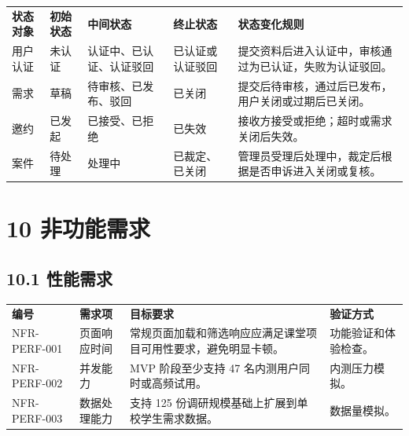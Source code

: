 {\def\LTcaptype{none} %
\begin{xltabular}{\textwidth}{@{}>{\centering\arraybackslash}X>{\centering\arraybackslash}X>{\centering\arraybackslash}X>{\centering\arraybackslash}X>{\centering\arraybackslash}X@{}}
\toprule\noalign{}
\endhead
\bottomrule\noalign{}
\endlastfoot
\textbf{状态对象} & \textbf{初始状态} & \textbf{中间状态} &
\textbf{终止状态} & \textbf{状态变化规则} \\
用户认证 & 未认证 & 认证中、已认证、认证驳回 & 已认证或认证驳回 &
提交资料后进入认证中，审核通过为已认证，失败为认证驳回。 \\
需求 & 草稿 & 待审核、已发布、驳回 & 已关闭 &
提交后待审核，通过后已发布，用户关闭或过期后已关闭。 \\
邀约 & 已发起 & 已接受、已拒绝 & 已失效 &
接收方接受或拒绝；超时或需求关闭后失效。 \\
案件 & 待处理 & 处理中 & 已裁定、已关闭 &
管理员受理后处理中，裁定后根据是否申诉进入关闭或复核。 \\
\end{xltabular}
}


\chapter{10 非功能需求}\label{ux975eux529fux80fdux9700ux6c42}

\section{10.1 性能需求}\label{ux6027ux80fdux9700ux6c42}

{\def\LTcaptype{none} %
\begin{xltabular}{\textwidth}{@{}>{\centering\arraybackslash}X>{\centering\arraybackslash}X>{\centering\arraybackslash}X>{\centering\arraybackslash}X@{}}
\toprule\noalign{}
\endhead
\bottomrule\noalign{}
\endlastfoot
\textbf{编号} & \textbf{需求项} & \textbf{目标要求} &
\textbf{验证方式} \\
NFR-PERF-001 & 页面响应时间 &
常规页面加载和筛选响应应满足课堂项目可用性要求，避免明显卡顿。 &
功能验证和体验检查。 \\
NFR-PERF-002 & 并发能力 & MVP 阶段至少支持 47 名内测用户同时或高频试用。
& 内测压力模拟。 \\
NFR-PERF-003 & 数据处理能力 & 支持 125
份调研规模基础上扩展到单校学生需求数据。 & 数据量模拟。 \\
\end{xltabular}
}

